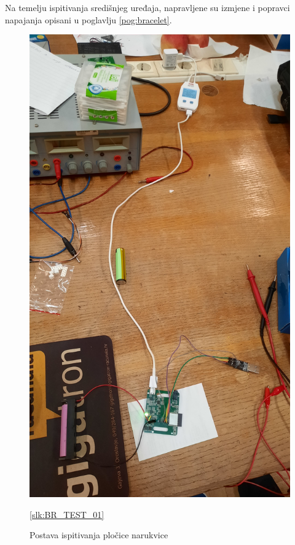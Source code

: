 Na temelju ispitivanja središnjeg uređaja, napravljene su izmjene i popravci napajanja opisani u poglavlju \ref{pog:bracelet}.
\begin{figure}[htb]
    \centering
    \includegraphics[width=10 cm]{Figures/BR_TEST_02.jpg}
    \caption{Postava ispitivanja pločice narukvice}
    \ref{slk:BR_TEST_01}
\end{figure}